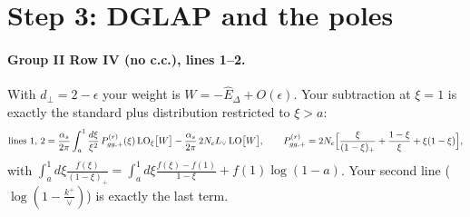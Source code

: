 \documentclass[10pt]{article}
\numberwithin{equation}{section}
\newcommand{\Lv}{L_{\vee}}
\newcommand{\Eh}{\hat E}
\newcommand{\LOx}[1]{{\rm LO}_\xi\big[#1\big]}
\begin{document}
\section{Step 3: DGLAP and the poles}\label{sec:dglap}
\paragraph{Group II Row IV (no c.c.), lines 1--2.} With $d_\perp=2-\epsilon$ your weight is $W=-\Eh_\Delta+O(\epsilon)$. Your subtraction at $\xi=1$ is exactly the standard plus distribution restricted to $\xi>a$:
\begin{equation}
\text{lines 1, 2}=\frac{\alpha_s}{2\pi}\int_{a}^1\frac{d\xi}{\xi^2}\,P^{(r)}_{gg,+}(\xi)\,\LOx{W}-\frac{\alpha_s}{2\pi}\,2N_c\Lv\,{\rm LO}\big[W\big],\qquad P^{(r)}_{gg,+}=2N_c\Big[\frac{\xi}{(1-\xi)_+}+\frac{1-\xi}{\xi}+\xi(1-\xi)\Big],
\label{eq:IVstd}
\end{equation}
with $\int_a^1d\xi\frac{f(\xi)}{(1-\xi)_+}=\int_a^1d\xi\frac{f(\xi)-f(1)}{1-\xi}+f(1)\log(1-a)$. Your second line ($\log(1-\frac{k^+}{\vee})$) is exactly the last term.
\end{document}
